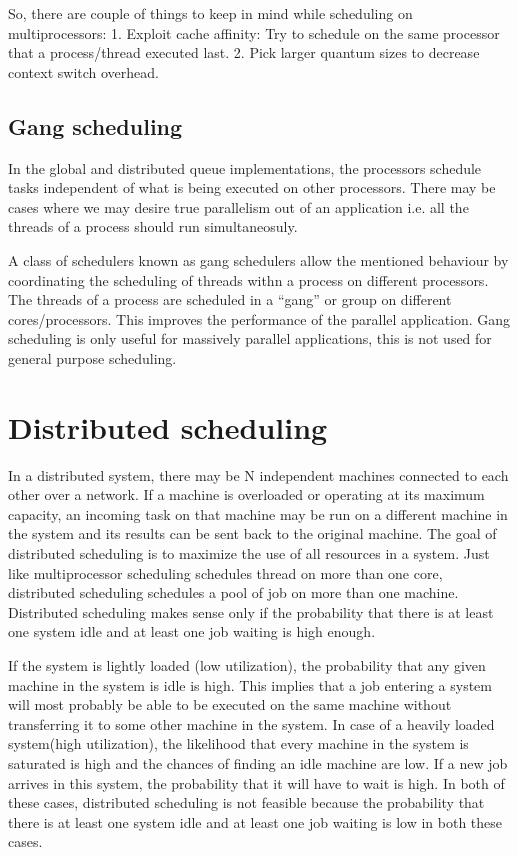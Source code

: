 \documentclass[twoside]{article}
\begin{document}
So, there are couple of things to keep in mind while scheduling on multiprocessors:
1. Exploit cache affinity: Try to schedule on the same
processor that a process/thread executed last. 
2. Pick larger quantum sizes to decrease context switch overhead. 



\subsection{Gang scheduling}
In the global and distributed queue implementations, the processors schedule tasks independent of what is being executed on other processors. There may be cases where we may desire true parallelism out of an application i.e. all the threads of a process should run simultaneosuly. 

A class of schedulers known as gang schedulers allow the mentioned behaviour by coordinating the scheduling of threads withn a process on different processors. The threads of a process are scheduled in a ``gang'' or group on different cores/processors. This improves the performance of the parallel application. Gang scheduling is only useful for massively parallel applications, this is not used for general purpose scheduling.


\section{Distributed scheduling}
In a distributed system, there may be N independent machines connected to each other over a network. If a machine is overloaded or operating at its maximum capacity, an incoming task on that machine may be run on a different machine in the system and its results can be sent back to the original machine. The goal of distributed scheduling is to maximize the use of all resources in a system. Just like multiprocessor scheduling schedules thread on more than one core, distributed scheduling schedules a pool of job on more than one machine. Distributed scheduling makes sense only if the probability that there is at least one system idle and at least one job waiting is high enough.

If the system is lightly loaded (low utilization), the probability that any given machine in the system is idle is high. This implies that a job entering a system will most probably be able to be executed on the same machine without transferring it to some other machine in the system. In case of a heavily loaded system(high utilization), the likelihood that every machine in the system is saturated is high and the chances of finding an idle machine are low. If a new job arrives in this system, the probability that it will have to wait is high. In both of these cases, distributed scheduling is not feasible because the probability that there is at least one system idle and at least one job waiting is low in both these cases.
\end{document}
